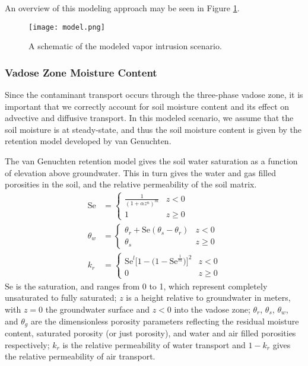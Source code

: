 An overview of this modeling approach may be seen in Figure \ref{fig:model}.\par

\begin{figure}
  \texttt{[image: model.png]}
  \caption{A schematic of the modeled vapor intrusion scenario.}
  \label{fig:model}
\end{figure}

\subsubsection{Vadose Zone Moisture Content}\label{sec:van_genuchten}

Since the contaminant transport occurs through the three-phase vadose zone, it is important that we correctly account for soil moisture content and its effect on advective and diffusive transport.
In this modeled scenario, we assume that the soil moisture is at steady-state, and thus the soil moisture content is given by the retention model developed by van Genuchten\cite{van_genuchten_closed-form_1980}.\par

The van Genuchten retention model gives the soil water saturation as a function of elevation above groundwater.
This in turn gives the water and gas filled porosities in the soil, and the relative permeability of the soil matrix.
\begin{align}
  \mathrm{Se} &=
    \begin{cases}\label{eq:van_genuchten_saturation}
      \frac{1}{(1 + \alpha z^n)^m} & z < 0 \\
    1 & z \geq 0
    \end{cases} \\
  \theta_w &=
    \begin{cases}\label{eq:van_genuchten_soil_moisture}
      \theta_r + \mathrm{Se}(\theta_s - \theta_r) & z < 0 \\
      \theta_s & z \geq 0
    \end{cases} \\
  k_r &=
    \begin{cases}\label{eq:van_genuchten_relative_permeability}
      \mathrm{Se}^l \big[ 1 - \big( 1 - \mathrm{Se}^\frac{1}{m} \big) \big]^2 & z < 0 \\
      0 & z \geq 0
    \end{cases}
\end{align}
$\mathrm{Se}$ is the saturation, and ranges from 0 to 1, which represent completely unsaturated to fully saturated;
$z$ is a height relative to groundwater in meters, with $z=0$ the groundwater surface and $z<0$ into the vadose zone;
$\theta_r$, $\theta_s$, $\theta_w$, and $\theta_g$ are the dimensionless porosity parameters reflecting the residual moisture content, saturated porosity (or just porosity), and water and air filled porosities respectively;
$k_r$ is the relative permeability of water transport and $1-k_r$ gives the relative permeability of air transport.\par

